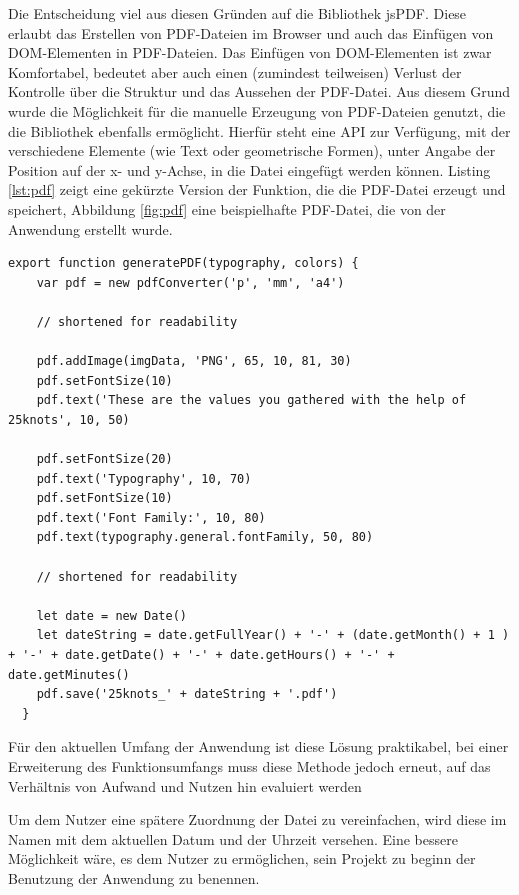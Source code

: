 
Die Entscheidung viel aus diesen Gründen auf die Bibliothek jsPDF\footnotemark{}. Diese erlaubt das Erstellen von PDF-Dateien im Browser und auch das Einfügen von DOM-Elementen in PDF-Dateien.
Das Einfügen von DOM-Elementen ist zwar Komfortabel, bedeutet aber auch einen (zumindest teilweisen) Verlust der Kontrolle über die Struktur und das Aussehen der PDF-Datei.
Aus diesem Grund wurde die Möglichkeit für die manuelle Erzeugung von PDF-Dateien genutzt, die die Bibliothek ebenfalls ermöglicht. Hierfür steht eine API zur Verfügung, mit der verschiedene Elemente (wie Text oder geometrische Formen), unter Angabe der Position auf der x- und y-Achse, in die Datei eingefügt werden können. Listing \ref{lst:pdf} zeigt eine gekürzte Version der Funktion, die die PDF-Datei erzeugt und speichert, Abbildung \ref{fig:pdf} eine beispielhafte PDF-Datei, die von der Anwendung erstellt wurde.

\begin{lstlisting}[caption={Beispilehafte Generierung einer PDF-Datei}, label=lst:pdf]
  export function generatePDF(typography, colors) {
    var pdf = new pdfConverter('p', 'mm', 'a4')

    // shortened for readability

    pdf.addImage(imgData, 'PNG', 65, 10, 81, 30)
    pdf.setFontSize(10)
    pdf.text('These are the values you gathered with the help of 25knots', 10, 50)

    pdf.setFontSize(20)
    pdf.text('Typography', 10, 70)
    pdf.setFontSize(10)
    pdf.text('Font Family:', 10, 80)
    pdf.text(typography.general.fontFamily, 50, 80)

    // shortened for readability

    let date = new Date()
    let dateString = date.getFullYear() + '-' + (date.getMonth() + 1 ) + '-' + date.getDate() + '-' + date.getHours() + '-' + date.getMinutes()
    pdf.save('25knots_' + dateString + '.pdf')
  }
\end{lstlisting}


Für den aktuellen Umfang der Anwendung ist diese Lösung praktikabel, bei einer Erweiterung des Funktionsumfangs muss diese Methode jedoch erneut, auf das Verhältnis von Aufwand und Nutzen hin evaluiert werden

Um dem Nutzer eine spätere Zuordnung der Datei zu vereinfachen, wird diese im Namen mit dem aktuellen Datum und der Uhrzeit versehen. Eine bessere Möglichkeit wäre, es dem Nutzer zu ermöglichen, sein Projekt zu beginn der Benutzung der Anwendung zu benennen.

